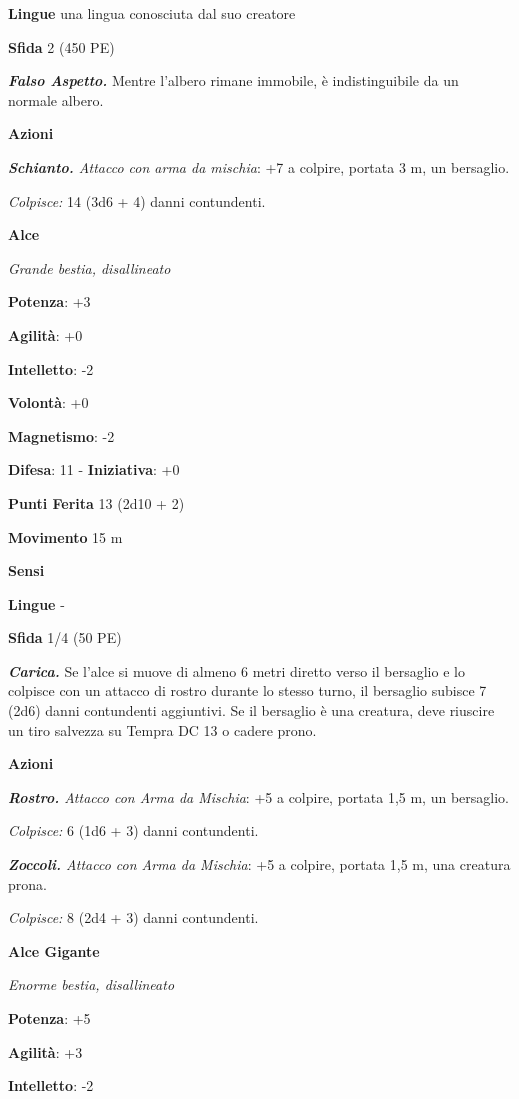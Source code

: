\begin{multicols}{2}
\textbf{Lingue} una lingua conosciuta dal suo creatore

\textbf{Sfida} 2 (450 PE)

\emph{\textbf{Falso Aspetto.}} Mentre l'albero rimane immobile, è
indistinguibile da un normale albero.

\textbf{Azioni}

\emph{\textbf{Schianto.} Attacco con arma da mischia}: +7 a colpire,
portata 3 m, un bersaglio.

\emph{Colpisce:} 14 (3d6 + 4) danni contundenti.

\textbf{Alce}

\emph{Grande bestia, disallineato}

\textbf{Potenza}: +3

\textbf{Agilità}: +0

\textbf{Intelletto}: -2

\textbf{Volontà}: +0

\textbf{Magnetismo}: -2

\textbf{Difesa}: 11 - \textbf{Iniziativa}: +0

\textbf{Punti Ferita} 13 (2d10 + 2)

\textbf{Movimento} 15 m

\textbf{Sensi} 

\textbf{Lingue} -

\textbf{Sfida} 1/4 (50 PE)

\emph{\textbf{Carica.}} Se l'alce si muove di almeno 6 metri diretto
verso il bersaglio e lo colpisce con un attacco di rostro durante lo
stesso turno, il bersaglio subisce 7 (2d6) danni contundenti aggiuntivi.
Se il bersaglio è una creatura, deve riuscire un tiro salvezza su Tempra
DC 13 o cadere prono.

\textbf{Azioni}

\emph{\textbf{Rostro.} Attacco con Arma da Mischia}: +5 a colpire,
portata 1,5 m, un bersaglio.

\emph{Colpisce:} 6 (1d6 + 3) danni contundenti.

\emph{\textbf{Zoccoli.} Attacco con Arma da Mischia}: +5 a colpire,
portata 1,5 m, una creatura prona.

\emph{Colpisce:} 8 (2d4 + 3) danni contundenti.

\textbf{Alce Gigante}

\emph{Enorme bestia, disallineato}

\textbf{Potenza}: +5

\textbf{Agilità}: +3

\textbf{Intelletto}: -2


\end{multicols}
